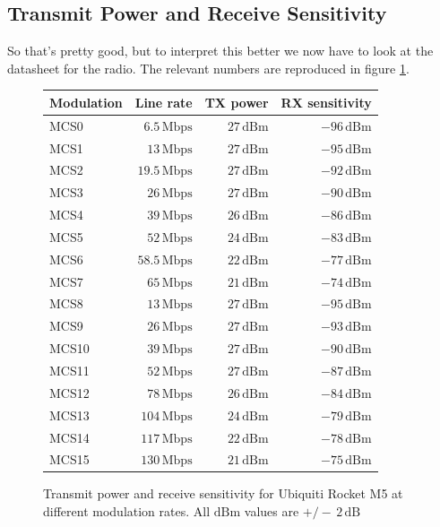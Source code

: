 \subsection{Transmit Power and Receive Sensitivity}
So that's pretty good, but to interpret this better we now have to
look at the datasheet for the radio. The relevant numbers are
reproduced in figure \ref{fig:rocket_txrx}.
\begin{figure}[ht]
  \begin{center}
    \begin{tabular}{lrrr}
      Modulation & Line rate & TX power & RX sensitivity\\
      \hline
      MCS0 & $6.5\, \mathrm{Mbps}$ & $27\, \mathrm{dBm}$ & $-96\,\mathrm{dBm}$\\
      MCS1 & $13\, \mathrm{Mbps}$ & $27\, \mathrm{dBm}$ & $-95\,\mathrm{dBm}$\\
      MCS2 & $19.5\, \mathrm{Mbps}$ & $27\, \mathrm{dBm}$ & $-92\,\mathrm{dBm}$\\
      MCS3 & $26\, \mathrm{Mbps}$ & $27\, \mathrm{dBm}$ & $-90\,\mathrm{dBm}$\\
      MCS4 & $39\, \mathrm{Mbps}$ & $26\, \mathrm{dBm}$ & $-86\,\mathrm{dBm}$\\
      MCS5 & $52\, \mathrm{Mbps}$ & $24\, \mathrm{dBm}$ & $-83\,\mathrm{dBm}$\\
      MCS6 & $58.5\, \mathrm{Mbps}$ & $22\, \mathrm{dBm}$ & $-77\,\mathrm{dBm}$\\
      MCS7 & $65\, \mathrm{Mbps}$ & $21\, \mathrm{dBm}$ & $-74\,\mathrm{dBm}$\\
      MCS8 & $13\, \mathrm{Mbps}$ & $27\, \mathrm{dBm}$ & $-95\,\mathrm{dBm}$\\
      MCS9 & $26\, \mathrm{Mbps}$ & $27\, \mathrm{dBm}$ & $-93\,\mathrm{dBm}$\\
      MCS10 & $39\, \mathrm{Mbps}$ & $27\, \mathrm{dBm}$ & $-90\,\mathrm{dBm}$\\
      MCS11 & $52\, \mathrm{Mbps}$ & $27\, \mathrm{dBm}$ & $-87\,\mathrm{dBm}$\\
      MCS12 & $78\, \mathrm{Mbps}$ & $26\, \mathrm{dBm}$ & $-84\,\mathrm{dBm}$\\
      MCS13 & $104\, \mathrm{Mbps}$ & $24\, \mathrm{dBm}$ & $-79\,\mathrm{dBm}$\\
      MCS14 & $117\, \mathrm{Mbps}$ & $22\, \mathrm{dBm}$ & $-78\,\mathrm{dBm}$\\
      MCS15 & $130\, \mathrm{Mbps}$ & $21\, \mathrm{dBm}$ & $-75\,\mathrm{dBm}$\\
    \end{tabular}
  \end{center}
  \caption{Transmit power and receive sensitivity for Ubiquiti Rocket
    M5 at different modulation rates. All $\mathrm{dBm}$ values are
    $+/-\, 2\, \mathrm{dB}$}
  \label{fig:rocket_txrx}
\end{figure}

